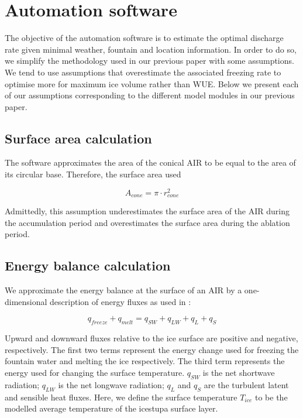 \documentclass[utf8]{frontiersSCNS}
\begin{document}
\section{Automation software}

The objective of the automation software is to estimate the optimal discharge rate given minimal weather,
fountain and location information. In order to do so, we simplify the methodology used in our previous paper
with some assumptions. We tend to use assumptions that overestimate the associated freezing rate to optimise
more for maximum ice volume rather than WUE. Below we present each of our assumptions corresponding to the
different model modules in our previous paper.

\subsection{Surface area calculation} \label{sec:shape}

The software approximates the area of the conical AIR to be equal to the area of its circular base. Therefore,
the surface area used

\begin{equation} A_{cone} =\pi \cdot r_{cone}^2 \label{eq:Area} \end{equation}

Admittedly, this assumption underestimates the surface area of the AIR during the accumulation period and
overestimates the surface area during the ablation period.  

\subsection{Energy balance calculation} \label{sec:energy}

We approximate the energy balance at the surface of an AIR by a one-dimensional description of energy fluxes as
used in \cite{Balasubramanian_2022}:

\begin{equation}
	 q_{freeze} + q_{melt} = q_{SW} + q_{LW} + q_{L} + q_{S}
	\label{eqn:EB}
\end{equation}

Upward and downward fluxes relative to the ice surface are positive and negative, respectively. The first two
terms represent the energy change used for freezing the fountain water and melting the ice respectively. The
third term represents the energy used for changing the surface temperature. $q_{SW}$ is the net shortwave
radiation; $q_{LW}$ is the net longwave radiation; $q_{L}$ and $q_{S}$ are the turbulent latent and sensible
heat fluxes.  Here, we define the surface temperature $T_{ice}$ to be the modelled average temperature of the
icestupa surface layer.
\end{document}
